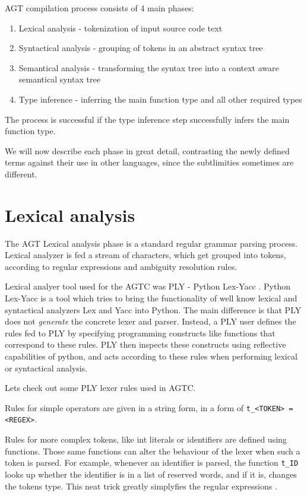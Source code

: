\documentclass[times, utf8, diplomski]{fer}
\theoremstyle{definition}
\newcommand{\pythoncode}[3]{
    
}
\begin{document}
AGT compilation process consists of 4 main phases: 

\begin{enumerate}
\item Lexical analysis - tokenization of input source code text
\item Syntactical analysis - grouping of tokens in an abstract syntax tree
\item Semantical analysis - transforming the syntax tree into a context aware semantical syntax tree
\item Type inference - inferring the main function type and all other required types
\end{enumerate}

The process is successful if the type inference step successfully infers the main function type.

We will now describe each phase in great detail, contrasting the newly defined terms
against their use in other languages, since the subtlimities sometimes are different.

\section{Lexical analysis}

The AGT Lexical analysis phase is a standard regular grammar parsing process.
Lexical analyzer is fed a stream of characters, which get grouped into tokens,
according to regular expressions and ambiguity resolution rules.

Lexical analyer tool used for the AGTC was PLY - Python Lex-Yacc \citep{c_ply_beazley}.
Python Lex-Yacc is a tool which tries to bring the functionality of well know lexical and syntactical
analyzers Lex and Yacc into Python. The main difference is that PLY does not \textit{generate} the 
concrete lexer and parser. Instead, a PLY user defines the rules fed to PLY by specifying programming 
constructs like functions that correspond to these rules. PLY then inspects these constructs using 
reflective capabilities of python, and acts according to these rules
when performing lexical or syntactical analysis.

Lets check out some PLY lexer rules used in AGTC.

\pythoncode{\resdir/compiler/lexer.py}{}{heyy}

Rules for simple operators are given in a string form, in a form of 
\texttt{t\_<TOKEN> = <REGEX>}.

Rules for more complex tokens, like int literals or identifiers are defined
using functions. Those same functions can alter the behaviour of the
lexer when such a token is parsed. For example, whenever an identifier is parsed,
the function \texttt{t\_ID} looks up whether the identifier is in a list of reserved
words, and if it is, changes the tokens type. This neat trick greatly simplyfies the
regular expressions \citep{c_ply_docs_beazley}.
\end{document}
